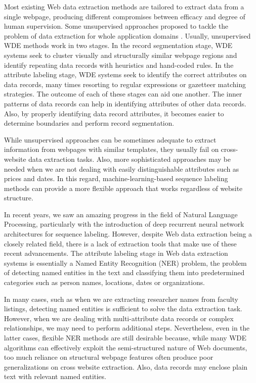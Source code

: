 \documentclass{nle}
\begin{document}
Most existing Web data extraction methods are tailored to extract data 
from a single webpage, producing different compromises between efficacy and 
degree of human supervision. Some unsupervised approaches proposed to tackle 
the problem of data extraction for whole application domains 
\cite{Zhu2005,Zhu2006,Abdessalem2010,Furche2012,Furche2012a}. Usually, 
unsupervised WDE methods work in two stages. In the record segmentation stage,
WDE systems seek to cluster visually and structurally similar webpage regions 
and identify repeating data records with heuristics and 
hand-coded rules. In the attribute labeling stage, WDE systems seek to identify 
the correct attributes on data records, many times resorting to regular expressions 
or gazetteer matching strategies. The outcome of each of these stages can aid one 
another. The inner patterns of data records can help in identifying attributes of other 
data records. Also, by properly identifying data record attributes, it becomes 
easier to determine boundaries and perform record segmentation.

While unsupervised approaches can be sometimes adequate to extract information from 
webpages with similar templates, they usually fail on cross-website data extraction 
tasks. Also, more sophisticated approaches may be needed when we are not dealing
with easily distinguishable attributes such as prices and dates. In this regard, 
machine-learning-based sequence labeling methods can provide a more flexible 
approach that works regardless of website structure.

In recent years, we saw an amazing progress in the field of Natural Language Processing, 
particularly with the introduction of deep recurrent neural network architectures
for sequence labeling. However, despite Web data extraction being a closely 
related field, there is a lack of extraction tools that make use of these recent 
advancements. The attribute labeling stage in Web data extraction systems
is essentially a Named Entity Recognition (NER) problem, the problem of 
detecting named entities in the text and classifying them into predetermined 
categories such as person names, locations, dates or organizations. 

In many cases, such as when we are extracting researcher names from faculty listings,
detecting named entities is sufficient to solve the data extraction task. However, when we are
dealing with multi-attribute data records or complex relationships, we may need to 
perform additional steps. Nevertheless, even in the latter cases, flexible NER methods 
are still desirable because, while many WDE algorithms can effectively exploit the 
semi-structured nature of Web documents, too much reliance on structural webpage 
features often produce poor generalizations on cross website extraction. Also, 
data records may enclose plain text with relevant named entities. 
\end{document}
